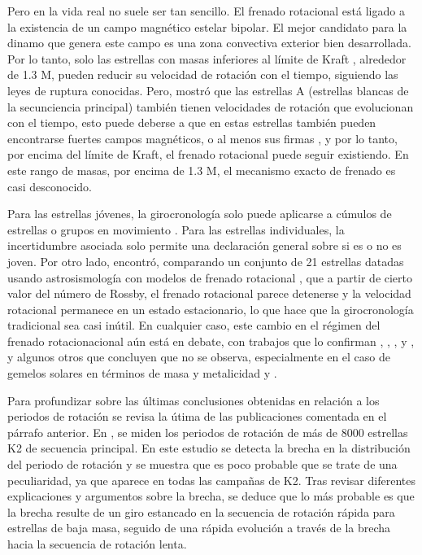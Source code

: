 Pero en la vida real no suele ser tan sencillo. El frenado rotacional está ligado a la existencia de un campo magnético estelar bipolar. El mejor candidato para la dinamo que genera este campo es una zona convectiva exterior bien desarrollada. Por lo tanto, solo las estrellas con masas inferiores al límite de Kraft \cite{Kraft67}, alrededor de 1.3 M, pueden reducir su velocidad de rotación con el tiempo, siguiendo las leyes de ruptura conocidas. Pero, \cite{Zorec12} mostró que las estrellas A (estrellas blancas de la secunciencia principal) también tienen velocidades de rotación que evolucionan con el tiempo, esto puede deberse a que en estas estrellas también pueden encontrarse fuertes campos magnéticos, o al menos sus firmas \cite{Balona17}, y por lo tanto, por encima del límite de Kraft, el frenado rotacional puede seguir existiendo. En este rango de masas, por encima de 1.3 M, el mecanismo exacto de frenado es casi desconocido.

Para las estrellas jóvenes, la girocronología solo puede aplicarse a cúmulos de estrellas o grupos en movimiento \cite{Curtis19}. Para las estrellas individuales, la incertidumbre asociada solo permite una declaración general sobre si es o no es joven. Por otro lado, \cite{Saders16} encontró, comparando un conjunto de 21 estrellas datadas usando astrosismología con modelos de frenado rotacional \cite{Saders13}, que a partir de cierto valor del número de Rossby, el frenado rotacional parece detenerse y la velocidad rotacional permanece en un estado estacionario, lo que hace que la girocronología tradicional sea casi inútil. En cualquier caso, este cambio en el régimen del frenado rotacionacional aún está en debate, con trabajos que lo confirman \cite{Gordon21}, \cite{Kitchatinov17}, \cite{Metcalfe19}, \cite{Metcalfe17} y \cite{Saders19}, y algunos otros que concluyen que no se observa, especialmente en el caso de gemelos solares en términos de masa y metalicidad \cite{Barnes16} y \cite{Oliveira19}.

Para profundizar sobre las últimas conclusiones obtenidas en relación a los periodos de rotación se revisa la útima de las publicaciones comentada en el párrafo anterior. En \cite{Gordon21}, se miden los periodos de rotación de más de 8000 estrellas K2 de secuencia principal. En este estudio se detecta la brecha en la distribución del periodo de rotación y se muestra que es poco probable que se trate de una peculiaridad, ya que aparece en todas las campañas de K2. Tras revisar diferentes explicaciones y argumentos sobre la brecha, se deduce que lo más probable es que la brecha resulte de un giro estancado en la secuencia de rotación rápida para estrellas de baja masa, seguido de una rápida evolución a través de la brecha hacia la secuencia de rotación lenta.


